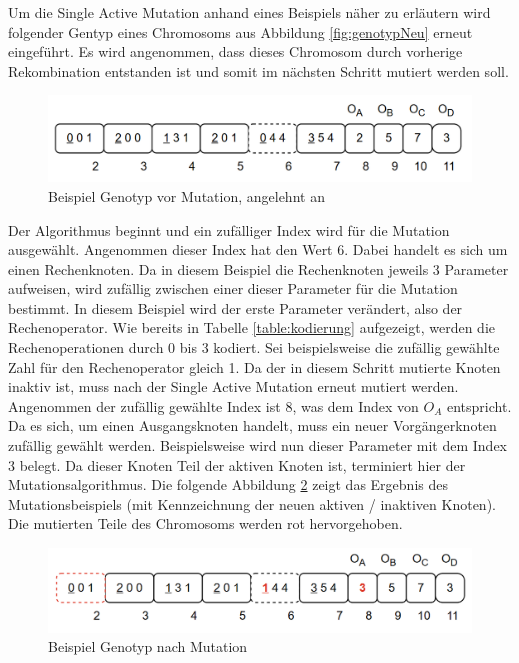 Um die Single Active Mutation anhand eines Beispiels näher zu erläutern wird folgender Gentyp eines Chromosoms aus Abbildung \ref{fig:genotypNeu} erneut eingeführt.
Es wird angenommen, dass dieses Chromosom durch vorherige Rekombination entstanden ist und somit im nächsten Schritt mutiert werden soll.

\begin{figure}[H]
	\centering
	\includegraphics[scale = 0.5]{Bilder/TorabiBeispielGenotypNeu.png}
	\caption{Beispiel Genotyp vor Mutation, angelehnt an \cite{torabi_using_2022}}
	\label{fig:genotypVorMutation}
\end{figure}

Der Algorithmus beginnt und ein zufälliger Index wird für die Mutation ausgewählt.
Angenommen dieser Index hat den Wert 6.
Dabei handelt es sich um einen Rechenknoten.
Da in diesem Beispiel die Rechenknoten jeweils 3 Parameter aufweisen, wird zufällig zwischen einer dieser Parameter für die Mutation bestimmt.
In diesem Beispiel wird der erste Parameter verändert, also der Rechenoperator.
Wie bereits in Tabelle \ref{table:kodierung} aufgezeigt, werden die Rechenoperationen durch 0 bis 3 kodiert.
Sei beispielsweise die zufällig gewählte Zahl für den Rechenoperator gleich 1.
Da der in diesem Schritt mutierte Knoten inaktiv ist, muss nach der Single Active Mutation erneut mutiert werden.\\
Angenommen der zufällig gewählte Index ist 8, was dem Index von $O_A$ entspricht.
Da es sich, um einen Ausgangsknoten handelt, muss ein neuer Vorgängerknoten zufällig gewählt werden.
Beispielsweise wird nun dieser Parameter mit dem Index 3 belegt.
Da dieser Knoten Teil der aktiven Knoten ist, terminiert hier der Mutationsalgorithmus.
Die folgende Abbildung \ref{fig:genotypNachMutation} zeigt das Ergebnis des Mutationsbeispiels (mit Kennzeichnung der neuen aktiven / inaktiven Knoten).
Die mutierten Teile des Chromosoms werden rot hervorgehoben.

\begin{figure}[H]
	\centering
	\includegraphics[scale = 0.5]{Bilder/GenotypNachMutation.png}
	\caption{Beispiel Genotyp nach Mutation}
	\label{fig:genotypNachMutation}
\end{figure}


